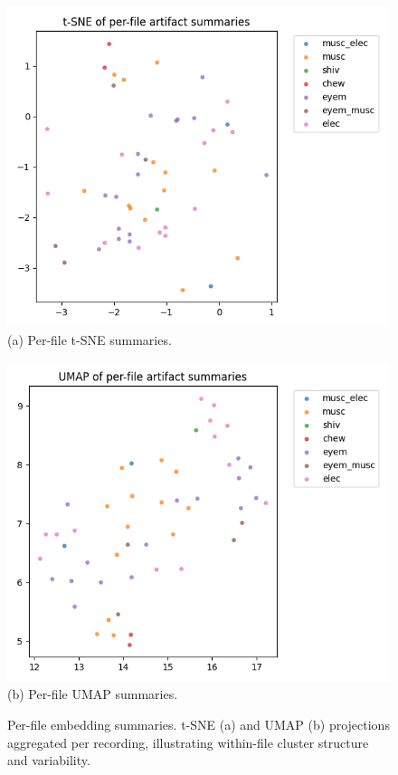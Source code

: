 \documentclass{article}
\begin{document}
\begin{figure}[t]
  \centering
  \begin{minipage}[t]{0.49\linewidth}
    \centering
    \includegraphics[width=\linewidth]{figs/tsne_perfile_summaries.png}\\
    \small (a) Per-file t\mbox{-}SNE summaries.
  \end{minipage}\hfill
  \begin{minipage}[t]{0.49\linewidth}
    \centering
    \includegraphics[width=\linewidth]{figs/umap_perfile_summaries.png}\\
    \small (b) Per-file UMAP summaries.
  \end{minipage}
  \caption{Per-file embedding summaries. t\mbox{-}SNE (a) and UMAP (b) projections aggregated per recording, illustrating within-file cluster structure and variability.}
  \label{fig:app-embed-perfile}
\end{figure}
\end{document}

